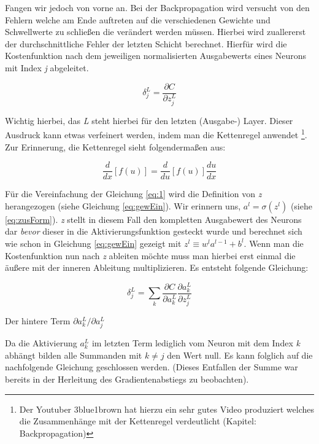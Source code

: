 Fangen wir jedoch von vorne an. Bei der Backpropagation wird versucht von den Fehlern welche am Ende auftreten auf die verschiedenen Gewichte und Schwellwerte zu schließen die verändert werden müssen. Hierbei wird zuallererst der durchschnittliche Fehler der letzten Schicht berechnet. Hierfür wird die Kostenfunktion nach dem jeweiligen normalisierten Ausgabewerts eines Neurons mit Index \emph{j} abgeleitet.

\begin{equation} \label{eq:1}
\delta^L_j = \frac{\partial C}{\partial z^L_j}
\end{equation}

Wichtig hierbei, das \emph{L} steht hierbei für den letzten (Ausgabe-) Layer. Dieser Ausdruck kann etwas verfeinert werden, indem man die Kettenregel anwendet \footnote{Der Youtuber 3blue1brown hat hierzu ein sehr gutes Video produziert welches die Zusammenhänge mit der Kettenregel verdeutlicht \cite{3b1b} (Kapitel: Backpropagation)}. Zur Erinnerung, die Kettenregel sieht folgendermaßen aus:  

\begin{equation}
\frac{d}{{dx}}\left[ {f\left( u \right)} \right] = \frac{d}{{du}}\left[ {f\left( u \right)} \right]\frac{{du}}{{dx}}
\end{equation}

Für die Vereinfachung der Gleichung \ref{eq:1} wird die Definition von \emph{z} herangezogen (siehe Gleichung \ref{eq:gewEin}). Wir erinnern uns, $a^l = \sigma(z^l)$ (siehe \ref{eq:zusForm}). \emph{z} stellt in diesem Fall den kompletten Ausgabewert des Neurons dar \emph{bevor} dieser in die Aktivierungsfunktion gesteckt wurde und berechnet sich wie schon in Gleichung \ref{eq:gewEin} gezeigt mit ${z^l \equiv w^l a^{l-1}+b^l}$. Wenn man die Kostenfunktion nun nach \emph{z} ableiten möchte muss man hierbei erst einmal die äußere mit der inneren Ableitung multiplizieren. Es entsteht folgende Gleichung: 

\begin{equation}
\delta^L_j = \sum_k \frac{\partial C}{\partial a^L_k} \frac{\partial a^L_k}{\partial z^L_j}
\end{equation}

Der hintere Term $\partial a^L_k / \partial a^L_j$

Da die Aktivierung $a^L_k$ im letzten Term lediglich vom Neuron mit dem Index \emph{k} abhängt bilden alle Summanden mit $k \neq j$ den Wert null. Es kann folglich auf die nachfolgende Gleichung geschlossen werden. (Dieses Entfallen der Summe war bereits in der Herleitung des Gradientenabstiegs zu beobachten). 

